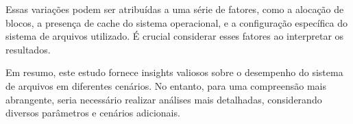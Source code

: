 \documentclass[
	12pt,				%
	openright,			%
	oneside,			%
	a4paper,			%
	chapter=TITLE,		%
	english,			%
	french,				%
	spanish,			%
	brazil				%
	]{abntex2}
\theoremstyle{definition}
\begin{document}
Essas variações podem ser atribuídas a uma série de fatores, como a 
alocação de blocos, a presença de cache do sistema operacional, e a 
configuração específica do sistema de arquivos utilizado. É crucial 
considerar esses fatores ao interpretar os resultados.

Em resumo, este estudo fornece insights valiosos sobre o desempenho do 
sistema de arquivos em diferentes cenários. No entanto, para uma compreensão 
mais abrangente, seria necessário realizar análises mais detalhadas, 
considerando diversos parâmetros e cenários adicionais.
\postextual



\cite{FAIRBANKS2012S118}
\cite{bovet_cesati_2005}
\cite{Tso}
\cite{matur}
\cite{kumar}
\cite{carrier2005file}
\end{document}
